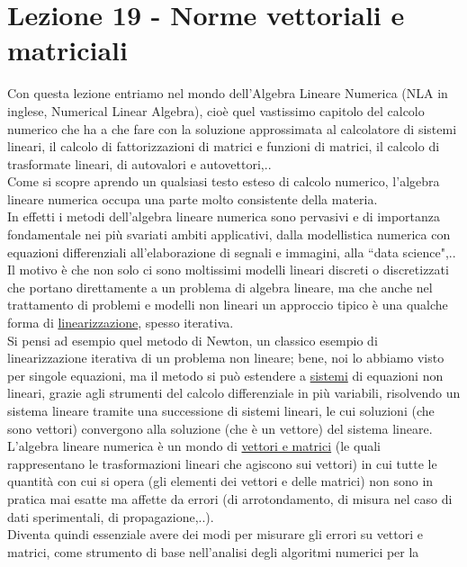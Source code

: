 \documentclass[12pt,a4paper]{article}
\begin{document}
\section{Lezione 19 - Norme vettoriali e matriciali}
Con questa lezione entriamo nel mondo dell'Algebra Lineare Numerica (NLA in inglese, Numerical Linear Algebra), cioè quel vastissimo capitolo del calcolo numerico che ha a che fare con la soluzione approssimata al calcolatore di sistemi lineari, il calcolo di fattorizzazioni di matrici
e funzioni di matrici, il calcolo di trasformate lineari, di autovalori e autovettori,..\\Come si scopre aprendo un qualsiasi testo esteso di calcolo numerico, l'algebra lineare numerica occupa una parte molto consistente della materia.\\In effetti i metodi dell'algebra lineare numerica sono pervasivi e di importanza fondamentale nei più svariati ambiti applicativi, dalla modellistica numerica con equazioni differenziali all'elaborazione di
segnali e immagini, alla ``data science",..\\Il motivo è che non solo ci sono moltissimi modelli lineari discreti o discretizzati che portano direttamente a un problema di algebra lineare, ma che anche nel trattamento di problemi e modelli non lineari un approccio tipico è una qualche forma di \uline{linearizzazione}, spesso iterativa.\\Si pensi ad esempio quel metodo di Newton, un classico esempio di linearizzazione iterativa di un problema non lineare; bene,
noi lo abbiamo visto per singole equazioni, ma il metodo si può estendere a \uline{sistemi} di equazioni non lineari, grazie agli strumenti del calcolo differenziale in più variabili, risolvendo un sistema lineare tramite una successione di sistemi lineari, le cui soluzioni (che sono vettori) convergono alla soluzione (che è un vettore) del sistema lineare.\\L'algebra lineare numerica è un mondo di \uline{vettori e matrici}
(le quali rappresentano  le trasformazioni lineari che agiscono sui vettori) in cui tutte le quantità con cui si opera (gli elementi dei vettori e delle matrici) non sono in pratica mai esatte ma affette da errori (di arrotondamento, di misura nel caso di dati sperimentali, di propagazione,..).\\Diventa quindi essenziale avere dei modi per misurare gli errori su vettori e matrici, come strumento di base nell'analisi degli algoritmi numerici per la
\end{document}
